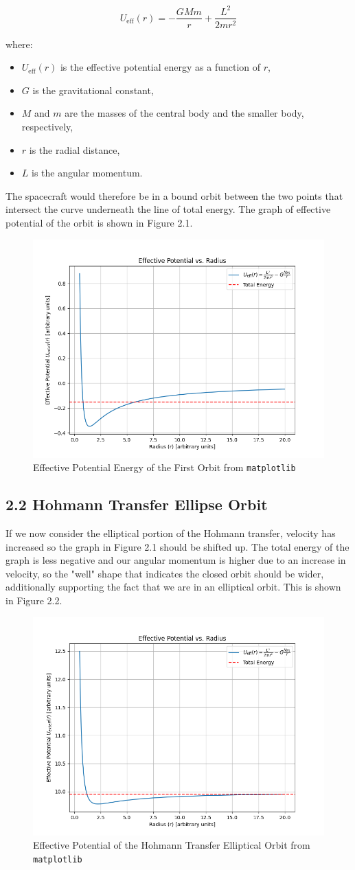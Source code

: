 \documentclass{article}
\numberwithin{figure}{section}
\begin{document}
\[
U_{\text{eff}}(r) = -\frac{GMm}{r} + \frac{L^2}{2mr^2}
\]

where:
\begin{itemize}
    \item \(U_{\text{eff}}(r)\) is the effective potential energy as a function of \(r\),
    \item \(G\) is the gravitational constant,
    \item \(M\) and \(m\) are the masses of the central body and the smaller body, respectively,
    \item \(r\) is the radial distance,
    \item \(L\) is the angular momentum.
\end{itemize}

The spacecraft would therefore be in a bound orbit between the two points that intersect the curve underneath the line of total energy. The graph of effective potential of the orbit is shown in Figure 2.1.

\begin{figure}[h]
    \centering
    \includegraphics[width=0.5\linewidth]{potent1.png}
    \caption{Effective Potential Energy of the First Orbit from \texttt{matplotlib}}
    \label{fig:enter-label}
\end{figure}
\subsection{2.2 Hohmann Transfer Ellipse Orbit}
If we now consider the elliptical portion of the Hohmann transfer, velocity has increased so the graph in Figure 2.1 should be shifted up. The total energy of the graph is less negative and our angular momentum is higher due to an increase in velocity, so the "well" shape that indicates the closed orbit should be wider, additionally supporting the fact that we are in an elliptical orbit. This is shown in Figure 2.2.

\begin{figure}
    \centering
    \includegraphics[width=0.5\linewidth]{elliptical.png}
    \caption{Effective Potential of the Hohmann Transfer Elliptical Orbit from \texttt{matplotlib}}
    \label{fig:enter-label}
\end{figure}
\end{document}
